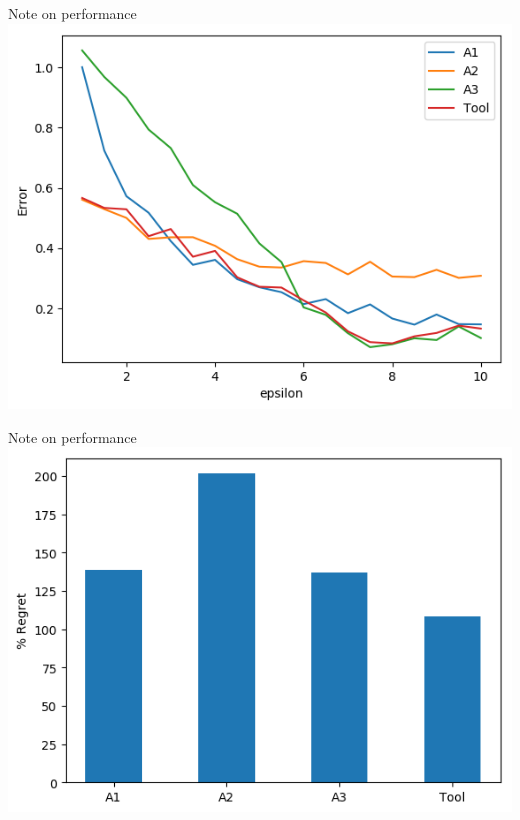 \documentclass{beamer}
\begin{document}
\begin{frame}{Note on performance}
\includegraphics[scale=0.7]{hist_graphs/Perf.png}
\end{frame}

\begin{frame}{Note on performance}
\includegraphics[scale=0.7]{hist_graphs/regret.png}
\end{frame}
\end{document}
